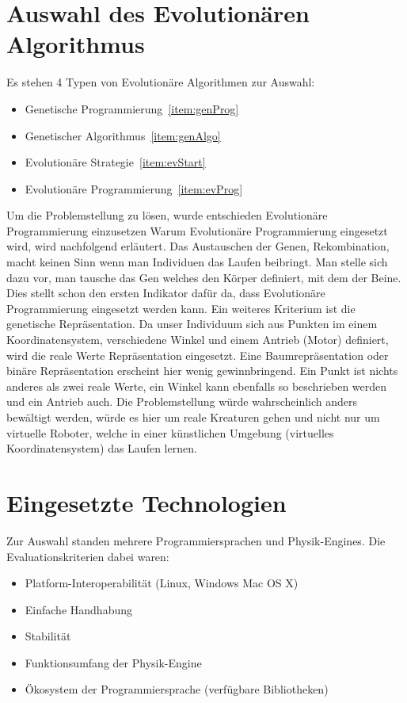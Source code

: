   \section{Auswahl des Evolutionären Algorithmus}

    Es stehen 4 Typen von Evolutionäre Algorithmen zur Auswahl:
    \begin{itemize}
      \item Genetische Programmierung~\ref{item:genProg}
      \item Genetischer Algorithmus~\ref{item:genAlgo}
      \item Evolutionäre Strategie~\ref{item:evStart}
      \item Evolutionäre Programmierung~\ref{item:evProg}
    \end{itemize}
    Um die Problemstellung zu lösen, wurde entschieden Evolutionäre Programmierung einzusetzen
    Warum Evolutionäre Programmierung eingesetzt wird, wird nachfolgend erläutert.
    Das Austauschen der Genen, Rekombination, macht keinen Sinn wenn man Individuen das Laufen beibringt.
    Man stelle sich dazu vor, man tausche das Gen welches den Körper definiert, mit dem der Beine.
    Dies stellt schon den ersten Indikator dafür da,
    dass Evolutionäre Programmierung eingesetzt werden kann.
    Ein weiteres Kriterium ist die genetische Repräsentation.
    Da unser Individuum sich aus Punkten im einem Koordinatensystem,
    verschiedene Winkel und einem Antrieb (Motor) definiert, wird die reale Werte Repräsentation eingesetzt.
    Eine Baumrepräsentation oder binäre Repräsentation erscheint hier wenig gewinnbringend.
    Ein Punkt ist nichts anderes als zwei reale Werte,
    ein Winkel kann ebenfalls so beschrieben werden und ein Antrieb auch.
    Die Problemstellung würde wahrscheinlich anders bewältigt werden,
    würde es hier um reale Kreaturen gehen und nicht nur um virtuelle Roboter,
    welche in einer künstlichen Umgebung (virtuelles Koordinatensystem) das Laufen lernen.

  \section{Eingesetzte Technologien\label{sec:Technology}}

    Zur Auswahl standen mehrere Programmiersprachen und Physik-Engines.
    Die Evaluationskriterien dabei waren:
    \begin{itemize}
      \item Platform-Interoperabilität (Linux, Windows Mac OS X)
      \item Einfache Handhabung
      \item Stabilität
      \item Funktionsumfang der Physik-Engine
      \item Ökosystem der Programmiersprache (verfügbare Bibliotheken)
    \end{itemize}

